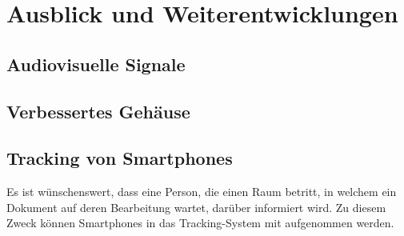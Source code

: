 \chapter{Ausblick und Weiterentwicklungen}
\section{Audiovisuelle Signale}

\section{Verbessertes Gehäuse}

\section{Tracking von Smartphones}

Es ist wünschenswert, dass eine Person, die einen Raum betritt, in welchem ein Dokument auf deren
Bearbeitung wartet, darüber informiert wird. Zu diesem Zweck können Smartphones in das
Tracking-System mit aufgenommen werden.
